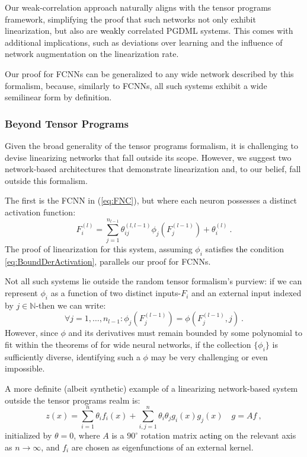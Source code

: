 \documentclass{article} %
\begin{document}
Our weak-correlation approach naturally aligns with the tensor programs framework, simplifying the proof that such networks not only exhibit linearization, but also are \textcolor{black}{weakly} correlated PGDML systems. This comes with additional implications, such as deviations over learning and the influence of network augmentation on the linearization rate.

Our proof for FCNNs can be generalized to any wide network described by this formalism, because, similarly to FCNNs, all such systems exhibit a wide semilinear form by definition.

\subsubsection{Beyond Tensor Programs}
\label{zap:sec:BeyondTenProg}

Given the broad generality of the tensor programs formalism, it is challenging to devise linearizing networks that fall outside its scope. However, we suggest two network-based architectures that demonstrate linearization and, to our belief, fall outside this formalism.

The first is the FCNN in (\ref{eq:FNC}), but where each neuron possesses a distinct activation function:
\begin{equation}
F_{i}^{(l)}=\sum_{j=1}^{n_{l-1}}\theta_{ij}^{(l,l-1)}\phi_{j}\left(F_{j}^{(l-1)}\right)+\theta_{i}^{(l)} \ .
\label{eq:FNCExp}
\end{equation}
The proof of linearization for this system, assuming \(\phi_i\) satisfies \textcolor{black}{the} condition \ref{eq:BoundDerActivation}, parallels our proof for FCNNs.

Not all such systems lie outside the random tensor formalism's purview: if we can represent \(\phi_i\) as a function of two distinct inputs-\(F_i\) and an external input indexed by \(j\in\mathbb{N}\)-then we can write:
\begin{equation}
\forall j=1,\ldots,n_{l-1}:\phi_{j}\left(F_{j}^{(l-1)}\right)=\phi\left(F_{j}^{(l-1)},j\right) \ .
\end{equation}
However, since \(\phi\) and its derivatives must remain bounded by some polynomial to fit within the theorems of \cite{TensorProgramsiib2021,TensorProgramsii2020} for wide neural networks, if the collection \(\{\phi_i\}\) is sufficiently diverse, identifying such a \(\phi\) may be very challenging or even impossible.

A more definite (albeit synthetic) example of a linearizing network-based system outside the tensor programs realm is:
\begin{equation}
z\left(x\right)=\sum_{i=1}^{n}\theta_{i}f_{i}\left(x\right)+\sum_{i,j=1}^{n}\theta_{i}\theta_{j}g_{i}\left(x\right)g_{j}\left(x\right)\quad g=Af \ ,
\end{equation}
initialized by \(\theta=0\), where \(A\) is a \(90^{\circ}\) rotation matrix \textcolor{black}{acting} on the relevant axis as \(n\rightarrow\infty\), and \(f_i\) are chosen as eigenfunctions of an external kernel.
\end{document}
